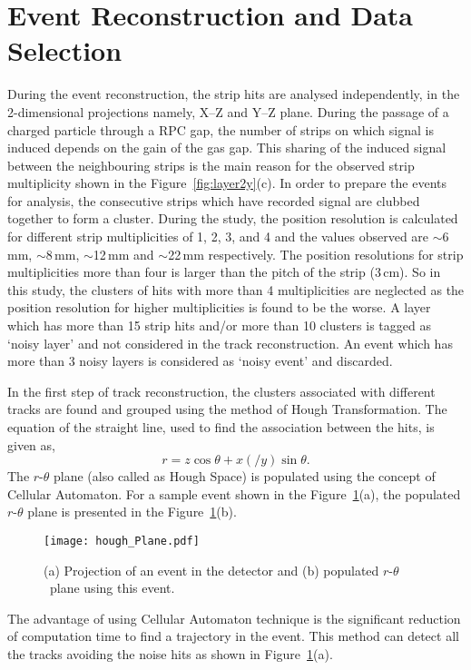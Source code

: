 \section{Event Reconstruction and Data Selection}\label{sec:reconstrction}
During the event reconstruction, the strip hits are analysed
independently, in the 2-dimensional projections namely,
\mbox{X--Z} and \mbox{Y--Z} plane. During the passage of a charged
particle through a RPC gap, the number of strips on which signal is
induced depends on the gain of the gas gap. This sharing of the induced
signal between the neighbouring strips is the main reason for the
observed strip multiplicity shown in the Figure~\ref{fig:layer2y}(c).
In order to prepare the events for analysis, the consecutive strips
which have recorded signal are clubbed together to form a cluster.
During the study, the position resolution is calculated for different
strip multiplicities of 1, 2, 3, and 4 and the values observed are
$\sim$6\,mm, $\sim$8\,mm, $\sim$12\,mm and $\sim$22\,mm respectively.
The position resolutions for strip multiplicities more than four is
larger than the pitch of the strip (3\,cm). So in this study,
the clusters of hits with more than 4 multiplicities are neglected
as the position resolution for higher multiplicities is found to be
the worse. A layer which has more than 15 strip hits and/or more
than 10 clusters is tagged as `noisy layer' and not considered
in the track reconstruction. An event which has more than 3 noisy
layers is considered as `noisy event' and discarded.

In the first step of track reconstruction, the clusters associated
with different tracks are found and grouped using the method of Hough
Transformation\cite{hought}. The equation of the straight line,
used to find the association between the hits, is given as,
\begin{equation}
  r=z\cos\theta+x\left(/y\right)\sin\theta. \label{eq:hough}
\end{equation}
The \mbox{$r$-$\theta$} plane (also called as Hough Space) is
populated using the concept of Cellular Automaton\cite{cellular}.
For a sample event shown in the Figure~\ref{fig:houghPl}(a),
the populated \mbox{$r$-$\theta$} plane is presented in the
Figure~\ref{fig:houghPl}(b).
\begin{figure}[h]
  \texttt{[image: hough\_Plane.pdf]} 
  \caption{(a) Projection of an event in the detector and
    (b) populated $r$-$\theta$~plane using this event.}
  \label{fig:houghPl}
\end{figure}
The advantage of using Cellular Automaton technique is the significant
reduction of computation time to find a trajectory in the event.
This method can detect all the tracks avoiding the noise hits as
shown in Figure~\ref{fig:houghPl}(a).

